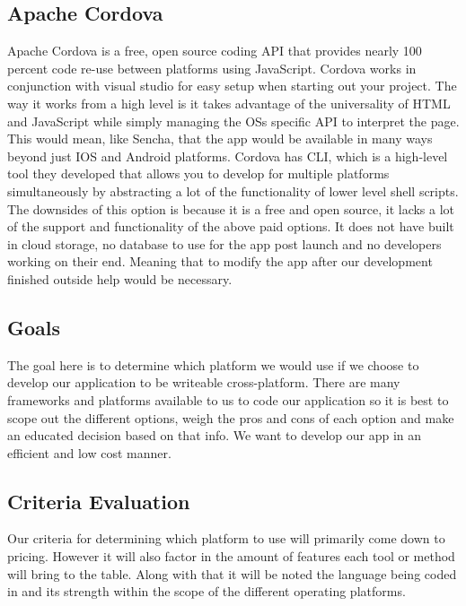 \documentclass[letterpaper,10pt,draftclsnofoot,onecolumn,titlepage]{IEEEtran}
\begin{document}
	\subsection{Apache Cordova}
		Apache Cordova is a free, open source coding API that provides nearly 100 percent code re-use between platforms using JavaScript. Cordova works in conjunction with visual studio for easy setup when starting out your project. The way it works from a high level is it takes advantage of the universality of HTML and JavaScript while simply managing the OSs specific API to interpret the page. This would mean, like Sencha, that the app would be available in many ways beyond just IOS and Android platforms. Cordova has CLI, which is a high-level tool they developed that allows you to develop for multiple platforms simultaneously by abstracting a lot of the functionality of lower level shell scripts. The downsides of this option is because it is a free and open source, it lacks a lot of the support and functionality of the above paid options. It does not have built in cloud storage, no database to use for the app post launch and no developers working on their end. Meaning that to modify the app after our development finished outside help would be necessary. 
	\subsection{Goals}
		The goal here is to determine which platform we would use if we choose to develop our application to be writeable cross-platform. There are many frameworks and platforms available to us to code our application so it is best to scope out the different options, weigh the pros and cons of each option and make an educated decision based on that info. We want to develop our app in an efficient and low cost manner.
	\subsection{Criteria Evaluation}
		Our criteria for determining which platform to use will primarily come down to pricing. However it will also factor in the amount of features each tool or method will bring to the table. Along with that it will be noted the language being coded in and its strength within the scope of the different operating platforms.
\end{document}
